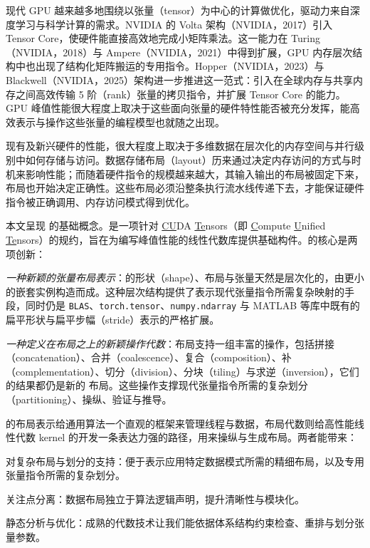 
现代 GPU 越来越多地围绕以张量（tensor）为中心的计算做优化，驱动力来自深度学习与科学计算的需求。NVIDIA 的 Volta 架构（NVIDIA，2017）引入 Tensor Core，使硬件能直接高效地完成小矩阵乘法。这一能力在 Turing（NVIDIA，2018）与 Ampere（NVIDIA，2021）中得到扩展，GPU 内存层次结构中也出现了结构化矩阵搬运的专用指令。Hopper（NVIDIA，2023）与 Blackwell（NVIDIA，2025）架构进一步推进这一范式：引入在全球内存与共享内存之间高效传输 5 阶（rank）张量的拷贝指令，并扩展 Tensor Core 的能力。GPU 峰值性能很大程度上取决于这些面向张量的硬件特性能否被充分发挥，能高效表示与操作这些张量的编程模型也就随之出现。

现有及新兴硬件的性能，很大程度上取决于多维数据在层次化的内存空间与并行级别中如何存储与访问。数据存储布局（layout）历来通过决定内存访问的方式与时机来影响性能；而随着硬件指令的规模越来越大，其输入输出的布局被固定下来，布局也开始决定正确性。这些布局必须沿整条执行流水线传递下去，才能保证硬件指令被正确调用、内存访问模式得到优化。

本文呈现 \CuTe 的基础概念。\CuTe 是一项针对 \underline{CU}DA \underline{Te}nsors（即 \underline{C}ompute \underline{U}nified \underline{Te}nsors）的规约，旨在为编写峰值性能的线性代数库提供基础构件。\CuTe 的核心是两项创新：
\begin{compactitem}
\item {\em 一种新颖的张量布局表示}：\CuTe 的形状（shape）、布局与张量天然是层次化的，由更小的嵌套实例构造而成。这种层次结构提供了表示现代张量指令所需复杂映射的手段，同时仍是 {\tt BLAS}、{\tt torch.tensor}、{\tt numpy.ndarray} 与 MATLAB 等库中既有的扁平形状与扁平步幅（stride）表示的严格扩展。
\item {\em 一种定义在布局之上的新颖操作代数}：\CuTe 布局支持一组丰富的操作，包括拼接（concatenation）、合并（coalescence）、复合（composition）、补（complementation）、切分（division）、分块（tiling）与求逆（inversion），它们的结果都仍是新的 \CuTe 布局。这些操作支撑现代张量指令所需的复杂划分（partitioning）、操纵、验证与推导。
\end{compactitem}

\CuTe 的布局表示给通用算法一个直观的框架来管理线程与数据，布局代数则给高性能线性代数 kernel 的开发一条表达力强的路径，用来操纵与生成布局。两者能带来：
\begin{compactitem}
\item 对复杂布局与划分的支持：\CuTe 便于表示应用特定数据模式所需的精细布局，以及专用张量指令所需的复杂划分。
\item 关注点分离：数据布局独立于算法逻辑声明，提升清晰性与模块化。
\item 静态分析与优化：成熟的代数技术让我们能依据体系结构约束检查、重排与划分张量参数。
\end{compactitem}

